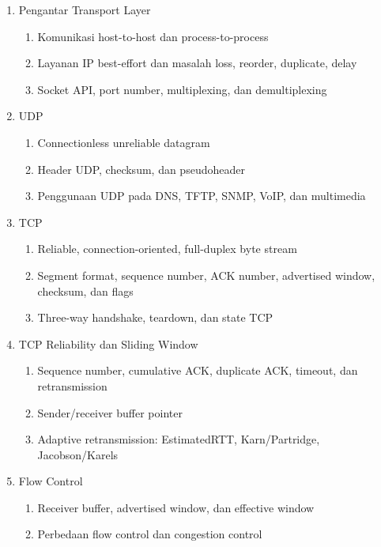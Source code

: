 \begin{enumerate}
    \item \pwajib Pengantar Transport Layer
    \begin{enumerate}
        \item \pwajib Komunikasi host-to-host dan process-to-process
        \item \pwajib Layanan IP best-effort dan masalah loss, reorder, duplicate, delay
        \item \pwajib Socket API, port number, multiplexing, dan demultiplexing
    \end{enumerate}
    \item \pwajib UDP
    \begin{enumerate}
        \item \pwajib Connectionless unreliable datagram
        \item \pwajib Header UDP, checksum, dan pseudoheader
        \item \ppaham Penggunaan UDP pada DNS, TFTP, SNMP, VoIP, dan multimedia
    \end{enumerate}
    \item \pwajib TCP
    \begin{enumerate}
        \item \pwajib Reliable, connection-oriented, full-duplex byte stream
        \item \pwajib Segment format, sequence number, ACK number, advertised window, checksum, dan flags
        \item \pwajib Three-way handshake, teardown, dan state TCP
    \end{enumerate}
    \item \pwajib TCP Reliability dan Sliding Window
    \begin{enumerate}
        \item \pwajib Sequence number, cumulative ACK, duplicate ACK, timeout, dan retransmission
        \item \pwajib Sender/receiver buffer pointer
        \item \pwajib Adaptive retransmission: EstimatedRTT, Karn/Partridge, Jacobson/Karels
    \end{enumerate}
    \item \pwajib Flow Control
    \begin{enumerate}
        \item \pwajib Receiver buffer, advertised window, dan effective window
        \item \ppaham Perbedaan flow control dan congestion control

\end{enumerate}
\end{enumerate}
